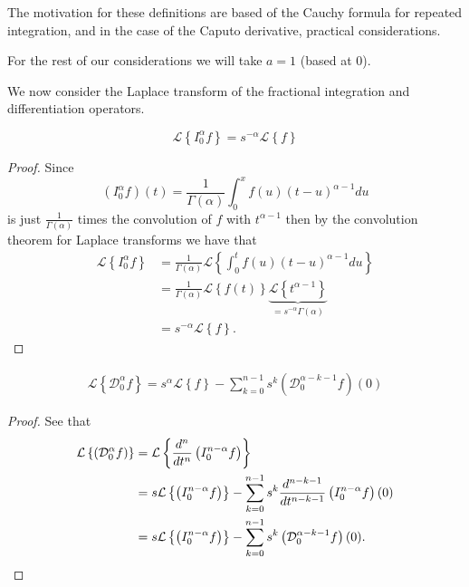 \documentclass{article}
\begin{document}
The motivation for these definitions are based of the Cauchy formula for repeated integration, and in the case
of the Caputo derivative, practical considerations. \cite{Samko1993, Podlubny1999} 

For the rest of our considerations we will take $ a = 1 $ (based at 0). 

We now consider the Laplace transform of the fractional integration and differentiation operators.

\begin{lemma}
	$$
		\mathcal{L} \left\{ I_0^\alpha f \right\}  = s^{-\alpha} \mathcal{L} \left\{ f \right\}
	$$
\end{lemma}
\begin{proof}
	Since 
	$$
		 (I_0^\alpha f)(t) = \frac{1}{\Gamma(\alpha)} \int_0^x f(u) (t-u)^{\alpha - 1} du
	$$
	is just $ \frac{1}{\Gamma(\alpha)} $ times the convolution of $ f $ with $ t^{\alpha - 1} $ then by the convolution theorem
	for Laplace transforms we have that 
	\begin{align*}
		\mathcal{L} \left\{ I_0^\alpha f \right\} &= \frac{1}{\Gamma(\alpha)} \mathcal{L} \left\{ \int_{0}^{t} f(u) (t-u)^{\alpha - 1} du \right\} \\
			&= \frac{1}{\Gamma(\alpha)} \mathcal{L} \left\{ f(t) \right\} \underbrace{\mathcal{L} \left\{ t^{\alpha - 1} \right\}}_{=s^{-\alpha} \Gamma(\alpha)} \\
			&= s^{-\alpha} \mathcal{L} \left\{ f \right\}.
	\end{align*}
\end{proof}

\begin{lemma}
	\begin{align*}
		\mathcal{L} \left\{\mathcal{D}_0^\alpha f\right\} = s^\alpha \mathcal{L} \left\{ f \right\} - \sum_{k=0}^{n-1} s^{k} \left( \mathcal{D}_0^{\alpha-k-1} f\right)(0)
	\end{align*}
\end{lemma}
\begin{proof}
	See that
	\begin{align*}
		\mathcal{L} \left\{  \left( \mathcal{D}_{0}^{\alpha} f \right)  \right\} &= \mathcal{L} \left\{  \frac{d^{n}}{dt^{n}} \left( I_{0}^{n-\alpha} f \right)  \right\} \\
			&= s\mathcal{L} \left\{ \left( I_{0}^{n-\alpha} f \right) \right\} - \sum_{k=0}^{n-1} s^k \frac{d^{n-k-1}}{dt^{n-k-1}} \left( I_{0}^{n-\alpha} f \right)(0) \\
			&= s\mathcal{L} \left\{ \left( I_{0}^{n-\alpha} f \right) \right\} - \sum_{k=0}^{n-1} s^{k} \left( \mathcal{D}_{0}^{\alpha - k - 1} f \right)(0). 
	\end{align*}
\end{proof}
\end{document}
